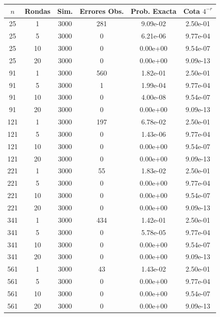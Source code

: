 \begin{tabular}{cccccc}
\toprule
$n$ & Rondas & Sim. & Errores Obs. & Prob. Exacta & Cota $4^{-r}$ \\
\midrule
25 & 1 & 3000 & 281 & 9.09e-02 & 2.50e-01 \\
25 & 5 & 3000 & 0 & 6.21e-06 & 9.77e-04 \\
25 & 10 & 3000 & 0 & 0.00e+00 & 9.54e-07 \\
25 & 20 & 3000 & 0 & 0.00e+00 & 9.09e-13 \\
91 & 1 & 3000 & 560 & 1.82e-01 & 2.50e-01 \\
91 & 5 & 3000 & 1 & 1.99e-04 & 9.77e-04 \\
91 & 10 & 3000 & 0 & 4.00e-08 & 9.54e-07 \\
91 & 20 & 3000 & 0 & 0.00e+00 & 9.09e-13 \\
121 & 1 & 3000 & 197 & 6.78e-02 & 2.50e-01 \\
121 & 5 & 3000 & 0 & 1.43e-06 & 9.77e-04 \\
121 & 10 & 3000 & 0 & 0.00e+00 & 9.54e-07 \\
121 & 20 & 3000 & 0 & 0.00e+00 & 9.09e-13 \\
221 & 1 & 3000 & 55 & 1.83e-02 & 2.50e-01 \\
221 & 5 & 3000 & 0 & 0.00e+00 & 9.77e-04 \\
221 & 10 & 3000 & 0 & 0.00e+00 & 9.54e-07 \\
221 & 20 & 3000 & 0 & 0.00e+00 & 9.09e-13 \\
341 & 1 & 3000 & 434 & 1.42e-01 & 2.50e-01 \\
341 & 5 & 3000 & 0 & 5.78e-05 & 9.77e-04 \\
341 & 10 & 3000 & 0 & 0.00e+00 & 9.54e-07 \\
341 & 20 & 3000 & 0 & 0.00e+00 & 9.09e-13 \\
561 & 1 & 3000 & 43 & 1.43e-02 & 2.50e-01 \\
561 & 5 & 3000 & 0 & 0.00e+00 & 9.77e-04 \\
561 & 10 & 3000 & 0 & 0.00e+00 & 9.54e-07 \\
561 & 20 & 3000 & 0 & 0.00e+00 & 9.09e-13 \\
\bottomrule
\end{tabular}
